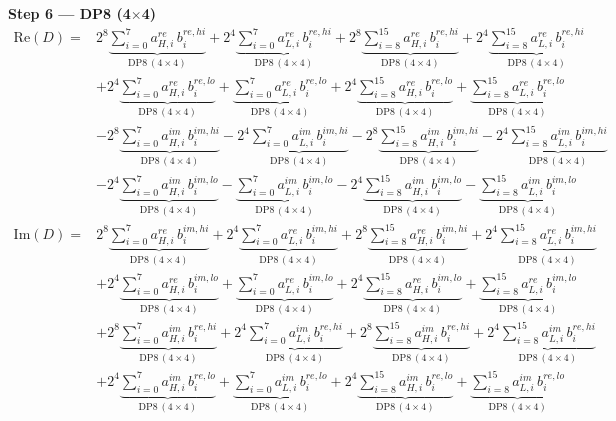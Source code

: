 \documentclass[fleqn]{article}
\newcommand{\DPop}[3]{\mathrm{DP#1}\,(#2\!\times\!#3)}
\begin{document}
\textbf{Step 6 --- DP8 (4$\times$4)}
\begin{align*}
\mathrm{Re}(D) = {}
  & 2^{8}\underbrace{\sum_{i=0}^{7} a_{H,i}^{re}\, b_i^{re,hi}}_{\DPop{8}{4}{4}}
  + 2^{4}\underbrace{\sum_{i=0}^{7} a_{L,i}^{re}\, b_i^{re,hi}}_{\DPop{8}{4}{4}}
  + 2^{8}\underbrace{\sum_{i=8}^{15} a_{H,i}^{re}\, b_i^{re,hi}}_{\DPop{8}{4}{4}}
  + 2^{4}\underbrace{\sum_{i=8}^{15} a_{L,i}^{re}\, b_i^{re,hi}}_{\DPop{8}{4}{4}} \\[0.6em]
  & + 2^{4}\underbrace{\sum_{i=0}^{7} a_{H,i}^{re}\, b_i^{re,lo}}_{\DPop{8}{4}{4}}
  + \underbrace{\sum_{i=0}^{7} a_{L,i}^{re}\, b_i^{re,lo}}_{\DPop{8}{4}{4}}
  + 2^{4}\underbrace{\sum_{i=8}^{15} a_{H,i}^{re}\, b_i^{re,lo}}_{\DPop{8}{4}{4}}
  + \underbrace{\sum_{i=8}^{15} a_{L,i}^{re}\, b_i^{re,lo}}_{\DPop{8}{4}{4}} \\[0.6em]
  & - 2^{8}\underbrace{\sum_{i=0}^{7} a_{H,i}^{im}\, b_i^{im,hi}}_{\DPop{8}{4}{4}}
  - 2^{4}\underbrace{\sum_{i=0}^{7} a_{L,i}^{im}\, b_i^{im,hi}}_{\DPop{8}{4}{4}}
  - 2^{8}\underbrace{\sum_{i=8}^{15} a_{H,i}^{im}\, b_i^{im,hi}}_{\DPop{8}{4}{4}}
  - 2^{4}\underbrace{\sum_{i=8}^{15} a_{L,i}^{im}\, b_i^{im,hi}}_{\DPop{8}{4}{4}} \\[0.6em]
  & - 2^{4}\underbrace{\sum_{i=0}^{7} a_{H,i}^{im}\, b_i^{im,lo}}_{\DPop{8}{4}{4}}
  - \underbrace{\sum_{i=0}^{7} a_{L,i}^{im}\, b_i^{im,lo}}_{\DPop{8}{4}{4}}
  - 2^{4}\underbrace{\sum_{i=8}^{15} a_{H,i}^{im}\, b_i^{im,lo}}_{\DPop{8}{4}{4}}
  - \underbrace{\sum_{i=8}^{15} a_{L,i}^{im}\, b_i^{im,lo}}_{\DPop{8}{4}{4}}
\end{align*}
\begin{align*}
\mathrm{Im}(D) = {}
  & 2^{8}\underbrace{\sum_{i=0}^{7} a_{H,i}^{re}\, b_i^{im,hi}}_{\DPop{8}{4}{4}}
  + 2^{4}\underbrace{\sum_{i=0}^{7} a_{L,i}^{re}\, b_i^{im,hi}}_{\DPop{8}{4}{4}}
  + 2^{8}\underbrace{\sum_{i=8}^{15} a_{H,i}^{re}\, b_i^{im,hi}}_{\DPop{8}{4}{4}}
  + 2^{4}\underbrace{\sum_{i=8}^{15} a_{L,i}^{re}\, b_i^{im,hi}}_{\DPop{8}{4}{4}} \\[0.6em]
  & + 2^{4}\underbrace{\sum_{i=0}^{7} a_{H,i}^{re}\, b_i^{im,lo}}_{\DPop{8}{4}{4}}
  + \underbrace{\sum_{i=0}^{7} a_{L,i}^{re}\, b_i^{im,lo}}_{\DPop{8}{4}{4}}
  + 2^{4}\underbrace{\sum_{i=8}^{15} a_{H,i}^{re}\, b_i^{im,lo}}_{\DPop{8}{4}{4}}
  + \underbrace{\sum_{i=8}^{15} a_{L,i}^{re}\, b_i^{im,lo}}_{\DPop{8}{4}{4}} \\[0.6em]
  & + 2^{8}\underbrace{\sum_{i=0}^{7} a_{H,i}^{im}\, b_i^{re,hi}}_{\DPop{8}{4}{4}}
  + 2^{4}\underbrace{\sum_{i=0}^{7} a_{L,i}^{im}\, b_i^{re,hi}}_{\DPop{8}{4}{4}}
  + 2^{8}\underbrace{\sum_{i=8}^{15} a_{H,i}^{im}\, b_i^{re,hi}}_{\DPop{8}{4}{4}}
  + 2^{4}\underbrace{\sum_{i=8}^{15} a_{L,i}^{im}\, b_i^{re,hi}}_{\DPop{8}{4}{4}} \\[0.6em]
  & + 2^{4}\underbrace{\sum_{i=0}^{7} a_{H,i}^{im}\, b_i^{re,lo}}_{\DPop{8}{4}{4}}
  + \underbrace{\sum_{i=0}^{7} a_{L,i}^{im}\, b_i^{re,lo}}_{\DPop{8}{4}{4}}
  + 2^{4}\underbrace{\sum_{i=8}^{15} a_{H,i}^{im}\, b_i^{re,lo}}_{\DPop{8}{4}{4}}
  + \underbrace{\sum_{i=8}^{15} a_{L,i}^{im}\, b_i^{re,lo}}_{\DPop{8}{4}{4}}
\end{align*}
\end{document}
